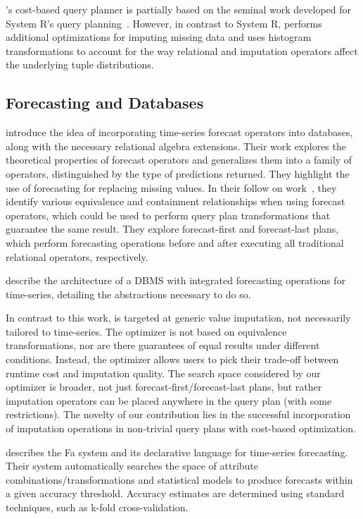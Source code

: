 \ProjectName's cost-based query planner 
is partially based on the seminal work developed for System R's query planning~\cite{blasgen1981system}.
However, in contrast to System R, \ProjectName{} performs additional optimizations for imputing missing data and
uses histogram transformations to account for the way relational and imputation operators affect the underlying
tuple distributions.

\subsection{Forecasting and Databases}
\cite{parisi2011embedding} introduce the idea of incorporating time-series forecast operators into
databases, along with the necessary relational algebra extensions. Their work explores the theoretical
properties of forecast operators and generalizes them into a family of operators, distinguished by
the type of predictions returned. They highlight the use of forecasting for replacing missing values.
In their follow on work~\cite{parisi2013temporal}, they identify various equivalence and containment
relationships when using forecast operators, which could be used to perform query plan transformations that guarantee the same result. They
explore forecast-first and forecast-last plans, which perform forecasting operations before and after executing all traditional
relational operators, respectively. 

\cite{fischer2013towards} describe the architecture of a DBMS with integrated forecasting operations for time-series, detailing
the abstractions necessary to do so.

In contrast to this work, \ProjectName{} is targeted at generic value imputation, not necessarily tailored to 
time-series. The optimizer is not based on equivalence transformations, nor are there guarantees of equal
results under different conditions. Instead, the optimizer allows users to pick their trade-off between
runtime cost and imputation quality. The search space considered by our optimizer is broader, not just
forecast-first/forecast-last plans, but rather imputation operators can be placed anywhere in the query plan
(with some restrictions). The novelty of our contribution lies in the successful incorporation of
imputation operations in non-trivial query plans with cost-based optimization.

\cite{duan2007processing} describes the Fa system and its declarative language for time-series forecasting. Their
system automatically searches the space of attribute combinations/transformations and statistical models
to produce forecasts within a given accuracy threshold. Accuracy estimates are determined using
standard techniques, such as k-fold cross-validation. 

